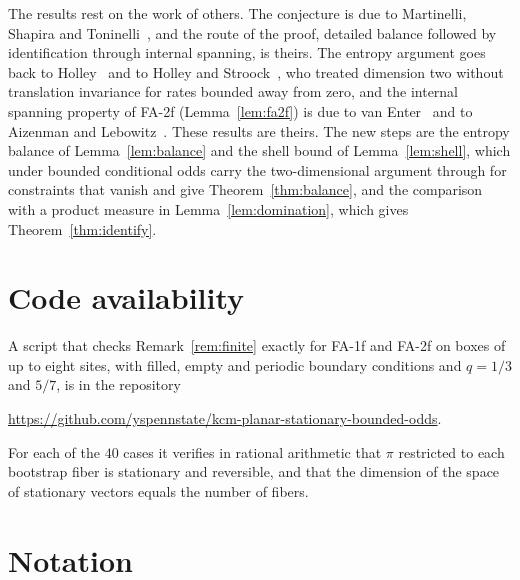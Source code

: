 \documentclass[11pt]{amsart}
\theoremstyle{remark}
\begin{document}
The results rest on the work of others. The conjecture is due to Martinelli, Shapira and Toninelli~\cite{MST25}, and
the route of the proof, detailed balance followed by identification through internal spanning, is theirs. The entropy
argument goes back to Holley~\cite{Hol71} and to Holley and Stroock~\cite{HS77}, who treated dimension two without
translation invariance for rates bounded away from zero, and the internal spanning property of FA-2f
(Lemma~\ref{lem:fa2f}) is due to van Enter~\cite{vE87} and to Aizenman and Lebowitz~\cite{AL88}. These results are
theirs. The new steps are the entropy balance of Lemma~\ref{lem:balance} and the shell bound of
Lemma~\ref{lem:shell}, which under bounded conditional odds carry the two-dimensional argument through for constraints
that vanish and give Theorem~\ref{thm:balance}, and the comparison with a product measure in
Lemma~\ref{lem:domination}, which gives Theorem~\ref{thm:identify}.

\section*{Code availability}
A script that checks Remark~\ref{rem:finite} exactly for FA-1f and FA-2f on boxes of up to eight sites, with filled,
empty and periodic boundary conditions and $q=1/3$ and $5/7$, is in the repository
\begin{center}\url{https://github.com/yspennstate/kcm-planar-stationary-bounded-odds}.\end{center}
For each of the $40$ cases it verifies in rational arithmetic that $\pi$ restricted to each bootstrap fiber is stationary
and reversible, and that the dimension of the space of stationary vectors equals the number of fibers.

\appendix
\section{Notation}\label{app:notation}
\end{document}
